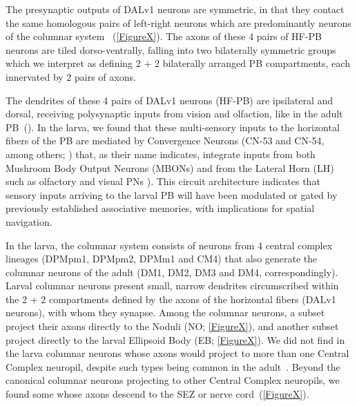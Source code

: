 \documentclass{article}
\begin{document}
The presynaptic outputs of DALv1 neurons are symmetric, in that they contact the same homologous pairs of left-right neurons which are predominantly neurons of the columnar system ~(\ref{FigureX}).
The axons of these 4 pairs of HF-PB neurons are tiled dorso-ventrally, falling into two bilaterally symmetric groups which we interpret as defining 2 + 2 bilaterally arranged PB compartments, each innervated by 2 pairs of axons. %

The dendrites of these 4 pairs of DALv1 neurons (HF-PB) are ipsilateral and dorsal, receiving polysynaptic inputs from vision and olfaction, like in the adult PB~(\citep{hulse2021connectome}). In the larva, we found that these multi-sensory inputs to the horizontal fibers of the PB are mediated by Convergence Neurons (CN-53 and CN-54, among others; \citealp{eschbach2021}) that, as their name indicates, integrate inputs from both Mushroom Body Output Neurons (MBONs) and from the Lateral Horn (LH) such as olfactory and visual PNs \citep{EsbachFushiki2021}). This circuit architecture indicates that sensory inputs arriving to the larval PB will have been modulated or gated by previously established associative memories, with implications for spatial navigation.










In the larva, the columnar system consists of neurons from 4 central complex lineages (DPMpm1, DPMpm2, DPMm1 and CM4) that also generate the columnar neurons of the adult (DM1, DM2, DM3 and DM4, correspondingly).
Larval columnar neurons present small, narrow dendrites circumscribed within the 2 + 2 compartments defined by the axons of the horizontal fibers (DALv1 neurons), with whom they synapse.
Among the columnar neurons, a subset project their axons directly to the Noduli (NO; \ref{FigureX}), and another subset project directly to the larval Ellipsoid Body (EB; \ref{FigureX}).
We did not find in the larva columnar neurons whose axons would project to more than one Central Complex neuropil, despite such types being common in the adult~\citep{wolff2015neuroarchitecture; wolff2018; hulse2021connectome}.
Beyond the canonical columnar neurons projecting to other Central Complex neuropils, we found some whose axons descend to the SEZ or nerve cord~(\ref{FigureX}).
\end{document}
